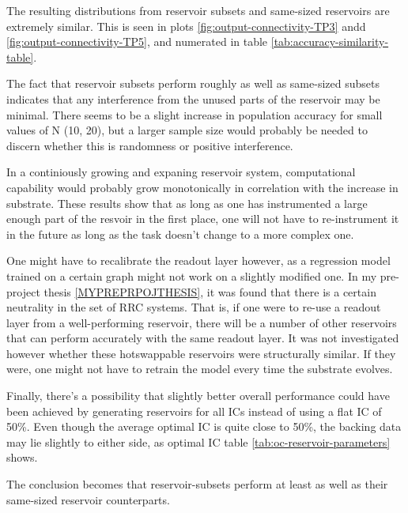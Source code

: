 The resulting distributions from reservoir subsets and same-sized reservoirs are extremely similar.
This is seen in plots \ref{fig:output-connectivity-TP3} andd \ref{fig:output-connectivity-TP5},
and numerated in table \ref{tab:accuracy-similarity-table}.


The fact that reservoir subsets perform roughly as well as same-sized subsets indicates that any interference from the unused parts of the reservoir may be minimal.
There seems to be a slight increase in population accuracy for small values of N (10, 20),
but a larger sample size would probably be needed to discern whether this is randomness or positive interference.

In a continiously growing and expaning reservoir system,
computational capability would probably grow monotonically in correlation with the increase in substrate.
These results show that as long as one has instrumented a large enough part of the resvoir in the first place,
one will not have to re-instrument it in the future as long as the task doesn't change to a more complex one.

One might have to recalibrate the readout layer however,
as a regression model trained on a certain graph might not work on a slightly modified one.
In my pre-project thesis \ref{MYPREPRPOJTHESIS},
it was found that there is a certain neutrality in the set of RRC systems.
That is, if one were to re-use a readout layer from a well-performing reservoir,
there will be a number of other reservoirs that can perform accurately with the same readout layer.
It was not investigated however whether these hotswappable reservoirs were structurally similar.
If they were, one might not have to retrain the model every time the substrate evolves.

Finally, there's a possibility that slightly better overall performance could have been achieved by generating reservoirs for all ICs instead of using a flat IC of 50\%.
Even though the average optimal IC is quite close to 50\%,
the backing data may lie slightly to either side,
as optimal IC table \ref{tab:oc-reservoir-parameters} shows.

The conclusion becomes that reservoir-subsets perform at least as well as their same-sized reservoir counterparts.
